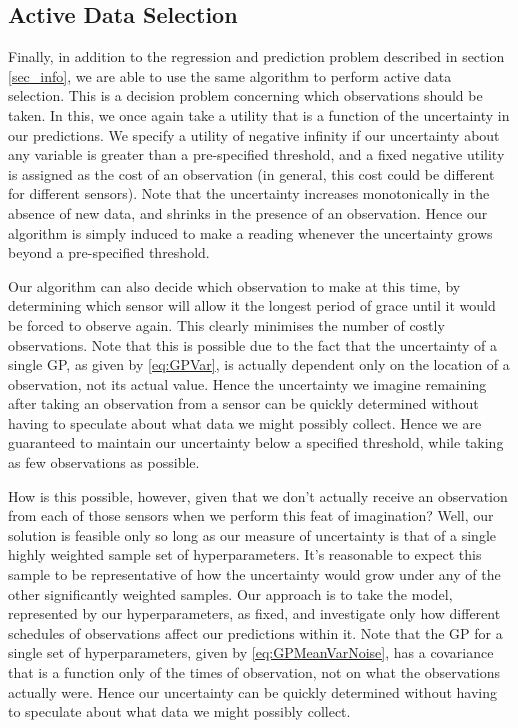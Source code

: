 \documentclass{acmtrans2m}
\begin{document}
\subsection{Active Data Selection}

\noindent Finally, in addition to the regression and prediction problem described in section \ref{sec_info}, we are able to use the same algorithm to perform active data selection. This is a decision problem concerning which observations should be taken. In this, we once again take a utility that is a function of the uncertainty in our predictions. We specify a utility of negative infinity if our uncertainty about any variable is greater than a pre-specified threshold, and a fixed negative utility is assigned as the cost of an observation (in general, this cost could be different for different sensors). Note that the uncertainty increases monotonically in the absence of new data, and shrinks in the presence of an observation. Hence our algorithm is simply induced to make a reading whenever the uncertainty grows beyond a pre-specified threshold. 

Our algorithm can also decide which observation to make at this time, by determining which sensor will allow it the longest period of grace until it would be forced to observe again. This clearly minimises the number of costly observations. Note that this is possible due to the fact that the uncertainty of a single GP, as given by \eqref{eq:GPVar}, is actually dependent only on the location of a observation, not its actual value. Hence the uncertainty we imagine remaining after taking an observation from a sensor can be quickly determined without having to speculate about what data we might possibly collect. Hence we are guaranteed to maintain our uncertainty below a specified threshold, while taking as few observations as possible.

How is this possible, however, given that we don't actually receive an observation from each of those sensors when we perform this feat of imagination? Well, our solution is feasible only so long as our measure of uncertainty is that of a single highly weighted sample set of hyperparameters. It's reasonable to expect this sample to be representative of how the uncertainty would grow under any of the other significantly weighted samples. Our approach is to take the model, represented by our hyperparameters, as fixed, and investigate only how different schedules of observations affect our predictions within it. Note that the GP for a single set of hyperparameters, given by \eqref{eq:GPMeanVarNoise}, has a covariance that is a function only of the times of observation, not on what the observations actually were. Hence our uncertainty can be quickly determined without having to speculate about what data we might possibly collect. 
\end{document}
